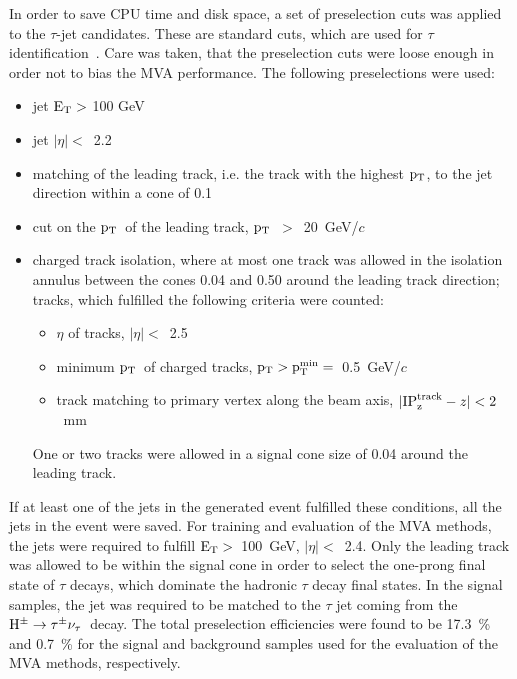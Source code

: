 \documentclass[a4paper]{jpconf}
\newcommand{\Hplustaunu}{\mbox{${\rm H}^{\pm} \to \tau^{\pm}\nu_{\tau}$}}
\newcommand{\pT}{\mbox{${\rm p}_{\rm T}$}}
\begin{document}
In order to save CPU time and disk space, a set of preselection cuts
was applied to the $\tau$-jet candidates. These are standard cuts,
which are used for $\tau$ identification~\cite{tautagging}. Care was
taken, that the preselection cuts were loose enough in order not to
bias the MVA performance. The following preselections were used:
\begin{itemize}
\item jet ${\rm E}_{\rm T} >$ 100 GeV
\item jet $|\eta|<$~2.2
\item matching of the leading track, i.e. the track with the highest
 \pT, to the jet direction within a cone of 0.1
\item cut on the \pT\ of the leading track, \pT~$>$~20~GeV/$c$
\item charged track isolation, where at most one track was allowed in the
 isolation annulus between the cones 0.04 and 0.50 
around the leading track direction; tracks, which fulfilled the
 following criteria were counted:
 \begin{itemize}
 \item $\eta$ of tracks, $|\eta|<$~2.5
 \item minimum \pT\ of charged tracks,
  ${\rm p}_{\rm T}>{\rm p}_{\rm T}^{\rm min} =$~0.5~GeV/$c$
 \item track matching to primary vertex along the beam axis, $|{\rm
  IP}_{\rm z}^{\rm track}-z|<2$~mm
 \end{itemize}
 One or two tracks were allowed in a signal cone size of 0.04 
around the leading track.
\end{itemize}
If at least one of the jets in the generated event fulfilled these
conditions, all the jets in the event were saved. For training and
evaluation of the MVA methods, the jets were required to fulfill
${\rm E}_{\rm T} >$~100~GeV, $|\eta|<$~2.4. Only the leading track was
allowed to be within the signal cone in order to select the
one-prong final state of $\tau$ decays, which dominate the hadronic
$\tau$ decay final states. In the signal samples, the jet was required
to be matched to the $\tau$ jet coming from the \Hplustaunu\ decay.
The total preselection efficiencies were found to be 17.3~\% and 0.7~\% for the
signal and background samples used for the evaluation of the MVA
methods, respectively.
\end{document}
